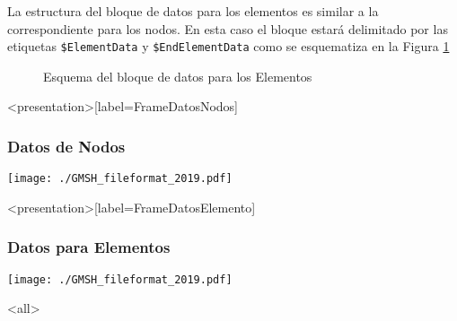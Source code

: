 La estructura del bloque de datos para los elementos
es similar a la correspondiente para los nodos. 
En esta caso el bloque estará delimitado por las
etiquetas \texttt{\$ElementData} y 
\texttt{\$EndElementData} como se esquematiza en la 
Figura \ref{FiguraDatosElementos} 

\begin{figure}

  \caption{Esquema del bloque de datos para los 
  Elementos\label{FiguraDatosElementos} }

\end{figure}

\mode* 

\begin{frame}<presentation>[label=FrameDatosNodos]
  \frametitle{Datos de Nodos}
  \texttt{[image: ./GMSH\_fileformat\_2019.pdf]}



\end{frame}


\begin{frame}<presentation>[label=FrameDatosElemento]
  \frametitle{Datos para Elementos}
  \texttt{[image: ./GMSH\_fileformat\_2019.pdf]}

\end{frame}

\mode<all>

